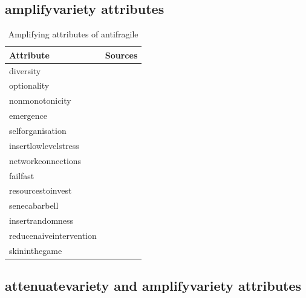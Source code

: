 \subsection{\Gls{amplifyvariety} attributes}
\begin{table}[H]
	\begin{center}
		\begin{tabular}{@{}ll@{}}
			\toprule
			\textbf{Attribute} & \textbf{Sources} \\%
			\midrule%
			\Gls{diversity} & \parencite{Botjes2020} \\%
			\Gls{optionality} & \parencites{Taleb2012}{Gorgeon2015} \\%
			\Gls{nonmonotonicity} & \parencite{Botjes2020} \\%
			\Gls{emergence} & \parencite{Botjes2020} \\%
			\Gls{selforganisation} & \parencite{Botjes2020} \\%
			\Gls{insertlowlevelstress} & \parencite{Botjes2020} \\%
			\Gls{networkconnections} & \parencite{Botjes2020} \\%
			\Gls{failfast} & \parencite{Botjes2020} \\%
			\Gls{resourcestoinvest} & \parencites{Taleb2012}{Botjes2020} \\%
			\Gls{senecabarbell} &  \parencites{Taleb2012}{Botjes2020} \\%
			\Gls{insertrandomness} & \parencites{Taleb2012}{Botjes2020} \\%
			\Gls{reducenaiveintervention} & \parencites{Taleb2012}{Botjes2020} \\%
			\Gls{skininthegame} & \parencites{Taleb2012}{Botjes2020} \\%
			\bottomrule%
		\end{tabular}
		\caption[Amplifying attributes of \gls{antifragile}]{Amplifying attributes of \gls{antifragile}}
		\label{tab:amplifyingattributes}
	\end{center}
\end{table}			

\subsection{\Gls{attenuatevariety} and \gls{amplifyvariety} attributes}

